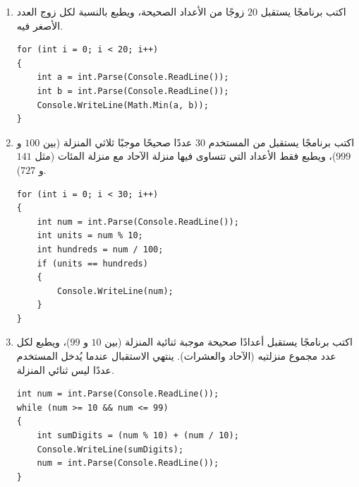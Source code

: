 \documentclass[14pt]{extarticle}
\begin{document}
\begin{enumerate}[resume, itemsep=1em]
\item اكتب برنامجًا يستقبل $20$ زوجًا من الأعداد الصحيحة، ويطبع بالنسبة لكل زوج العدد الأصغر فيه.
\ifwithsols
\begin{boxSolution}
\begin{english}
\begin{verbatim}
for (int i = 0; i < 20; i++)
{
    int a = int.Parse(Console.ReadLine());
    int b = int.Parse(Console.ReadLine());
    Console.WriteLine(Math.Min(a, b));
}
\end{verbatim}
\end{english}
\end{boxSolution}
\fi
\filbreak

\item اكتب برنامجًا يستقبل من المستخدم $30$ عددًا صحيحًا موجبًا ثلاثي المنزلة (بين $100$ و $999$)، ويطبع فقط الأعداد التي تتساوى فيها منزلة الآحاد مع منزلة المئات (مثل $141$ و $727$).
\ifwithsols
\begin{boxSolution}
\begin{english}
\begin{verbatim}
for (int i = 0; i < 30; i++)
{
    int num = int.Parse(Console.ReadLine());
    int units = num % 10;
    int hundreds = num / 100;
    if (units == hundreds)
    {
        Console.WriteLine(num);
    }
}
\end{verbatim}
\end{english}
\end{boxSolution}
\fi
\filbreak

\item اكتب برنامجًا يستقبل أعدادًا صحيحة موجبة ثنائية المنزلة (بين $10$ و $99$)، ويطبع لكل عدد مجموع منزلتيه (الآحاد والعشرات). ينتهي الاستقبال عندما يُدخل المستخدم عددًا ليس ثنائي المنزلة.
\ifwithsols
\begin{boxSolution}
\begin{english}
\begin{verbatim}
int num = int.Parse(Console.ReadLine());
while (num >= 10 && num <= 99)
{
    int sumDigits = (num % 10) + (num / 10);
    Console.WriteLine(sumDigits);
    num = int.Parse(Console.ReadLine());
}
\end{verbatim}
\end{english}
\end{boxSolution}
\fi
\filbreak

\end{enumerate}

\clearpage
\end{document}
